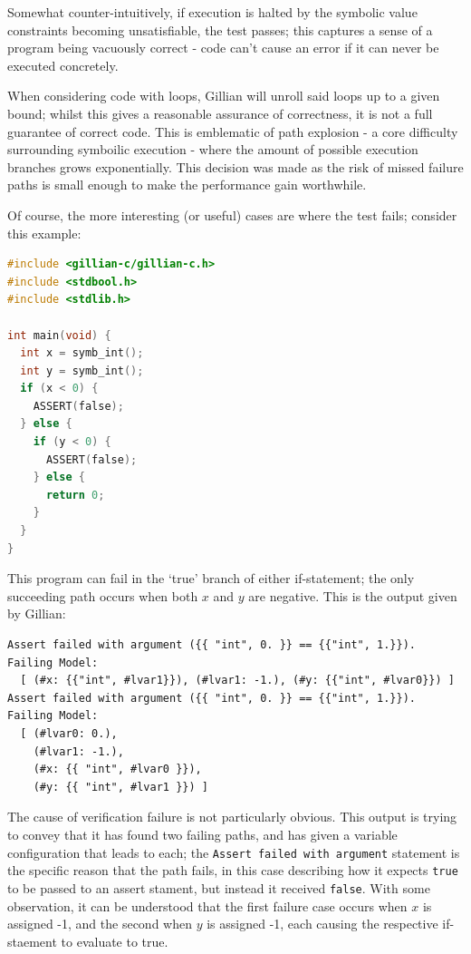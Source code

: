 Somewhat counter-intuitively, if execution is halted by the symbolic value
constraints becoming unsatisfiable, the test passes; this captures a sense of
a program being vacuously correct - code can't cause an error if it can never
be executed concretely.

When considering code with loops, Gillian will unroll said loops up to a given bound; whilst this gives a reasonable assurance of correctness, it is not a full guarantee of correct code. This is emblematic of path explosion - a core difficulty surrounding symboilic execution - where the amount of possible execution branches grows exponentially. This decision was made as the risk of missed failure paths is small enough to make the performance gain worthwhile.

Of course, the more interesting (or useful) cases are where the test fails; consider this example:

\begin{lstlisting}[caption={Symbolic execution - assertion failure}, style=code, language=C]
#include <gillian-c/gillian-c.h>
#include <stdbool.h>
#include <stdlib.h>

int main(void) {
  int x = symb_int();
  int y = symb_int();
  if (x < 0) {
    ASSERT(false);
  } else {
    if (y < 0) {
      ASSERT(false);
    } else {
      return 0;
    }
  }
}
\end{lstlisting}

This program can fail in the `true' branch of either if-statement; the only succeeding path occurs when both $x$ and $y$ are negative. This is the output given by Gillian:

\begin{lstlisting}[numbers=none, style=terminal, caption={Symbolic execution - assertion failure (Gillian output)}]
Assert failed with argument ({{ "int", 0. }} == {{"int", 1.}}).
Failing Model:
  [ (#x: {{"int", #lvar1}}), (#lvar1: -1.), (#y: {{"int", #lvar0}}) ]
Assert failed with argument ({{ "int", 0. }} == {{"int", 1.}}).
Failing Model:
  [ (#lvar0: 0.),
    (#lvar1: -1.),
    (#x: {{ "int", #lvar0 }}),
    (#y: {{ "int", #lvar1 }}) ]
\end{lstlisting}

The cause of verification failure is not particularly obvious. This output is
trying to convey that it has found two failing paths, and has given a variable
configuration that leads to each; the \texttt{Assert failed with argument}
statement is the specific reason that the path fails, in this case describing
how it expects \texttt{true} to be passed to an assert stament, but instead it received \texttt{false}. With some observation, it can be understood that the first failure case occurs when $x$ is assigned -1, and the second when $y$ is assigned -1, each causing the respective if-staement to evaluate to true.

